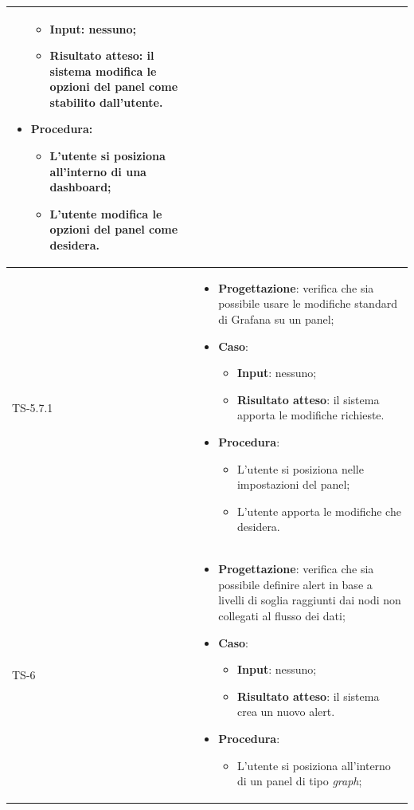 \begin{longtable}{|C{2.5cm}|C{13cm}|}
\begin{itemize}
\begin{itemize}
		\item \textbf{Input}: nessuno;
		\item \textbf{Risultato atteso}: il sistema modifica le opzioni del panel come stabilito dall'utente.
	\end{itemize}
	\item \textbf{Procedura}:
	\begin{itemize}
		\item L'utente si posiziona all'interno di una dashboard;
		\item L'utente modifica le opzioni del panel come desidera.
	\end{itemize} 
\end{itemize}
	 \\
	\hline
	{TS-5.7.1} & 
\begin{itemize}
	\item \textbf{Progettazione}: verifica che sia possibile usare le
	modifiche standard di Grafana su un panel;
	\item \textbf{Caso}: 
	\begin{itemize}
		\item \textbf{Input}: nessuno;
		\item \textbf{Risultato atteso}: il sistema apporta le modifiche richieste.
	\end{itemize}
	\item \textbf{Procedura}:
	\begin{itemize}
		\item L'utente si posiziona nelle impostazioni del panel;
		\item L'utente apporta le modifiche che desidera.
	\end{itemize} 
\end{itemize}
	 \\
	\hline
	{TS-6} & 
\begin{itemize}
	\item \textbf{Progettazione}: verifica che sia  possibile definire alert in
	base a livelli di soglia raggiunti dai nodi non collegati al flusso dei dati;
	\item \textbf{Caso}: 
	\begin{itemize}
		\item \textbf{Input}: nessuno;
		\item \textbf{Risultato atteso}: il sistema crea un nuovo alert.
	\end{itemize}
	\item \textbf{Procedura}:
	\begin{itemize}
		\item L'utente si posiziona all'interno di un panel di tipo \emph{graph};

\end{itemize}
\end{itemize}
\end{longtable}
